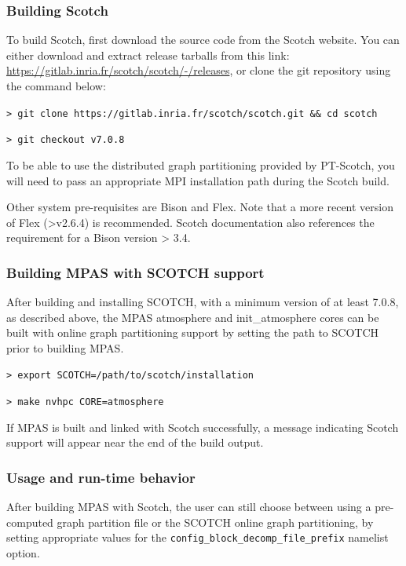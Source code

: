 \subsubsection{Building Scotch}
To build Scotch, first download the source code from the Scotch website. You can either download and extract release
tarballs from this link:
\url{https://gitlab.inria.fr/scotch/scotch/-/releases}, or clone the git repository using the command below:

\vspace{12pt}
{\tt > git clone https://gitlab.inria.fr/scotch/scotch.git \&\& cd scotch}

{\tt > git checkout v7.0.8}
\vspace{12pt}

To be able to use the distributed graph partitioning provided by PT-Scotch, you will need to pass an appropriate MPI installation path during the Scotch build.

Other system pre-requisites are Bison and Flex. Note that a more recent version of Flex (>v2.6.4) is recommended. Scotch documentation also references the requirement for a Bison version > 3.4.

\subsubsection{Building MPAS with SCOTCH support}
After building and installing SCOTCH, with a minimum version of at least 7.0.8, as described above,
the MPAS atmosphere and init\_atmosphere cores can be built with online graph partitioning support
by setting the path to SCOTCH prior to building MPAS.

\vspace{12pt}
{\tt > export SCOTCH=/path/to/scotch/installation}

{\tt > make nvhpc CORE=atmosphere}
\vspace{12pt}

If MPAS is built and linked with Scotch successfully, a message indicating Scotch support will appear near the
end of the build output.

\subsubsection{Usage and run-time behavior}
\label{sec:scotch_runtime_behavior}
After building MPAS with Scotch, the user can still choose between using a pre-computed graph partition
file or the SCOTCH online graph partitioning, by setting appropriate values for the      
{\tt config\_block\_decomp\_file\_prefix} namelist option.

